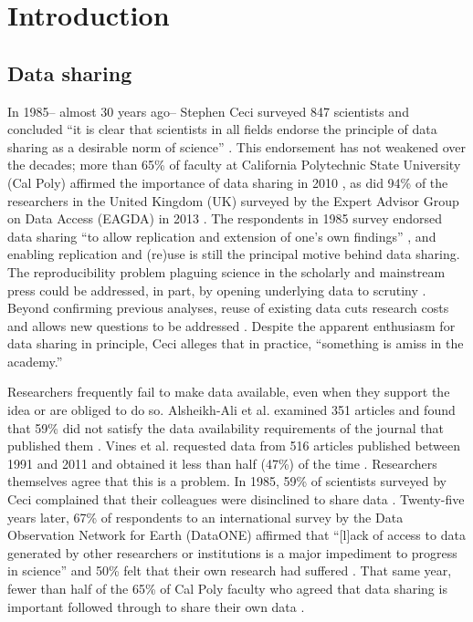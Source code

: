 \documentclass[10pt]{article}
\begin{document}
\section*{Introduction}

\subsection*{Data sharing}

In 1985-- almost 30 years ago-- Stephen Ceci surveyed 847 scientists and concluded ``it is clear that scientists in all fields endorse the principle of data sharing as a desirable norm of science'' \cite{ceci_scientists_1988}.
This endorsement has not weakened over the decades; more than 65\% of faculty at California Polytechnic State University (Cal Poly) affirmed the importance of data sharing in 2010 \cite{scaramozzino_study_2012}, as did  94\% of the researchers in the United Kingdom (UK) surveyed by the Expert Advisor Group on Data Access (EAGDA) in 2013 \cite{bobrow_establishing_2014}.
The respondents in 1985 survey endorsed data sharing ``to allow replication and extension of one's own findings'' \cite{ceci_scientists_1988}, and enabling replication and (re)use is still the principal motive behind data sharing.
The reproducibility problem plaguing science in the scholarly \cite{ioannidis_why_2005, prinz_believe_2011, mobley_survey_2013} and mainstream \cite{zimmer_rise_2012, _how_2013, editors_trouble_2013} press could be addressed, in part, by opening underlying data to scrutiny \cite{drew_lost_2013, collins_nih_2014}.
Beyond confirming previous analyses, reuse of existing data cuts research costs \cite{piwowar_data_2011} and allows new questions to be addressed \cite{stewart_meta-analysis_2010, borenstein_introduction_2011}.
Despite the apparent enthusiasm for data sharing in principle, Ceci alleges that in practice, ``something is amiss in the academy.''

Researchers frequently fail to make data available, even when they support the idea or are obliged to do so.
Alsheikh-Ali et al. examined 351 articles and found that 59\% did not satisfy the data availability requirements of the journal that published them \cite{alsheikh-ali_public_2011}.
Vines et al. requested data from 516 articles published between 1991 and 2011 and obtained it less than half (47\%) of the time \cite{vines_availability_2014}.
Researchers themselves agree that this is a problem.
In 1985, 59\% of scientists surveyed by Ceci complained that their colleagues were disinclined to share data \cite{ceci_scientists_1988}.
Twenty-five years later, 67\% of respondents to an international survey by the Data Observation Network for Earth (DataONE) affirmed that ``[l]ack of access to data generated by other researchers or institutions is a major impediment to progress in science'' and 50\% felt that their own research had suffered \cite{tenopir_data_2011}.
That same year, fewer than half of the 65\% of Cal Poly faculty who agreed that data sharing is important followed through to share their own data \cite{scaramozzino_study_2012}.
\end{document}

